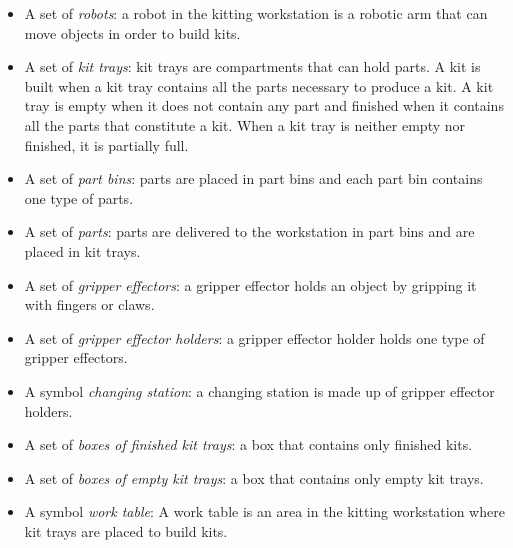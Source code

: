 \begin{small}
\begin{itemize}
\item A set of \emph{robots}: a robot in the kitting workstation is a robotic arm that can move objects in order to build kits.

\item A set of \emph{kit trays}: kit trays are compartments that can hold parts. A kit is built when a kit tray contains all the parts necessary to produce a kit. A kit tray is empty when it does not contain any part and finished when it contains all the parts that constitute a kit. When a kit tray is neither empty nor finished, it is partially full.

\item A set of \emph{part bins}: parts are placed in part bins and each part bin contains one type of parts.

\item A set of \emph{parts}: parts are delivered to the workstation in part bins and are placed in kit trays.

\item A set of \emph{gripper effectors}: a gripper effector holds an object by gripping it with
fingers or claws.

\item A set of \emph{gripper effector holders}: a gripper effector holder holds one type of gripper effectors.

\item A symbol \emph{changing station}: a changing station is made up of gripper effector holders.

\item A set of \emph{boxes of finished kit trays}: a box that contains only finished kits.

\item A set of \emph{boxes of empty kit trays}: a box that contains only empty kit trays.

\item A symbol \emph{work table}: A work table is an area in the kitting workstation where kit trays are placed to build kits.
\end{itemize}
\end {small}
